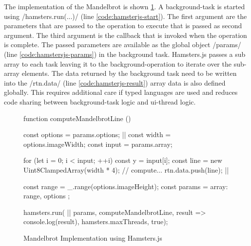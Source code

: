 The implementation of the Mandelbrot is shown \cref{fig:mandelbrot-hamsterjs}. A background-task is started using \javascriptinline/hamsters.run(...)/ (line \ref{code:hamsterjs-start}). The first argument are the parameters that are passed to the operation to execute that is passed as second argument. The third argument is the callback that is invoked when the operation is complete. The passed parameters are available as the global object \javascriptinline/params/ (line \ref{code:hamstersjs-params}) in the background task. Hamsters.js passes a sub array to each task leaving it to the background-operation to iterate over the sub-array elements. The data returned by the background task need to be written into the \javascriptinline/rtn.data/ (line \ref{code:hamsterjs-result}) array data is also defined globally. This requires additional care if typed languages are used and reduces code sharing between background-task logic and ui-thread logic.

\begin{figure}
\begin{javascriptcode}
function computeMandelbrotLine () {
	const options = params.options; |$\label{code:hamstersjs-params}$|
	const width = options.imageWidth;
	const input = params.array;

	for (let i = 0; i < input; ++i) {
		const y = input[i];
		const line = new Uint8ClampedArray(width * 4);
		// compute...
		rtn.data.push(line); |$\label{code:hamsterjs-result}$|
	}
}

const range = _.range(options.imageHeight);
const params = {
	array: range,
	options
};

hamsters.run( |$\label{code:hamsterjs-start}$|
	params,  
	computeMandelbrotLine, 
	result => console.log(result), 
	hamsters.maxThreads, 
	true);
\end{javascriptcode}
\caption{Mandelbrot Implementation using Hamsters.js}
\label{fig:mandelbrot-hamsterjs}
\end{figure}
